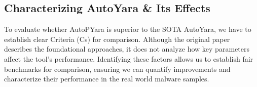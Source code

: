 

\subsection{Characterizing AutoYara \& Its Effects}
\label{subsec:AutoYaraEval}


\noindent To evaluate whether AutoPYara is superior to the SOTA AutoYara, we have to establish clear Criteria (Cs) for comparison. Although the original paper describes the foundational approaches, it does not analyze how key parameters affect the tool’s performance. Identifying these factors allows us to establish fair benchmarks for comparison, ensuring we can quantify improvements and characterize their performance in the real world malware samples. 




